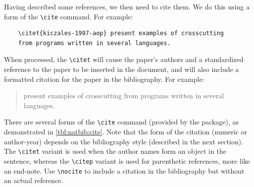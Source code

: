 Having described some references, we then need to cite them.  We
do this using a form of the \verb+\cite+ command.  For example:
\begin{lstlisting}
    \citet{kiczales-1997-aop} present examples of crosscutting 
    from programs written in several languages.
\end{lstlisting}
When processed, the \verb+\citet+ will cause the paper's authors
and a standardized reference to the paper to be inserted in the
document, and will also include a formatted citation for the paper
in the bibliography.  For example:
\begin{quote}
    \citet{kiczales-1997-aop} present examples of crosscutting 
    from programs written in several languages.
\end{quote}
There are several forms of the \verb+\cite+ command (provided
by the  package), as demonstrated in
\autoref{tbl:natbib:cite}.
Note that the form of the citation (numeric or author-year) depends
on the bibliography style (described in the next section).
The \verb+\citet+ variant is used when the author names form
an object in the sentence, whereas the \verb+\citep+ variant
is used for parenthetic references, more like an end-note.
Use \verb+\nocite+ to include a citation in the bibliography
but without an actual reference.
\nocite{rowling-1997-hpps}
\nocite{abadi-2016-hpps}
\nocite{cruz-2005-role}
\nocite{10.1145/1066157.1066283}
